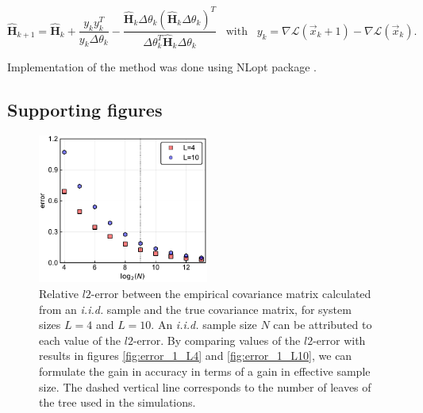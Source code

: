 \documentclass[preprint,amsmath,amssymb,superscriptaddress,showpacs,pre]{revtex4-1}
\begin{document}
$$\mathbf{\hat{H}}_{k+1}=\mathbf{\hat{H}}_{k}+\frac{y_k y^{T}_k}{y_k\Delta \theta_k} - \frac{\mathbf{\hat{H}}_k\Delta \theta_k(\mathbf{\hat{H}}_k\Delta \theta_k)^T}{\Delta \theta^T_k\mathbf{\hat{H}}_k\Delta \theta_k} \;\;\;\text{with}\;\;\; y_k=\nabla \mathcal{L}(\vec{x}_k+1)-\nabla \mathcal{L}(\vec{x}_k).$$

Implementation of the method was done using NLopt package \cite{NLopt} .
 
\subsection{Supporting figures}
\label{sub:supplementary_figures}

\begin{figure}[!htb]
	\centering
	\includegraphics[keepaspectratio=true,width=0.5\textwidth]{Figures/error_Ciid_vs_numb_of_seq.pdf}
	\caption{Relative $l2$-error between the empirical covariance matrix calculated from an \emph{i.i.d.} sample and the true covariance matrix, for system sizes $L=4$ and $L=10$. An \emph{i.i.d.} sample size $N$ can be attributed to each value of the $l2$-error. By comparing values of the $l2$-error with results in figures \ref{fig:error_1_L4} and \ref{fig:error_1_L10}, we can formulate the gain in accuracy in terms of a gain in effective sample size. The dashed vertical line corresponds to the number of leaves of the tree used in the simulations.}
	\label{fig:error_vs_nseqs}
\end{figure}
\end{document}
